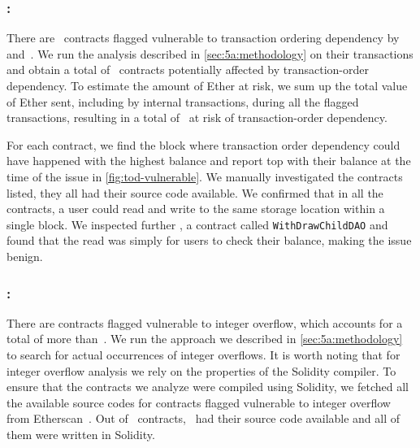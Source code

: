 



\subsubsection{\vto: \transactionorder}
There are~ contracts flagged vulnerable to transaction ordering dependency by~\cite{luu2016a} and~\cite{DBLP:conf/ndss/KalraGDS18}. We run the analysis described in \autoref{sec:5a:methodology} on their  transactions and obtain a total of~ contracts potentially affected by transaction-order dependency. To estimate the amount of Ether at risk, we sum up the total value of Ether sent, including by internal transactions, during all the flagged transactions, resulting in a total of~ at risk of transaction-order dependency.

For each contract, we find the block where transaction order dependency could have happened with the highest balance and report top with their balance at the time of the issue in \autoref{fig:tod-vulnerable}. We manually investigated the contracts listed, they all had their source code available. We confirmed that in all the contracts, a user could read and write to the same storage location within a single block. We inspected further , a contract called \lstinline{WithDrawChildDAO} and found that the read was simply for users to check their balance, making the issue benign.

% 



\subsubsection{\vio: \integeroverflow}
\label{ssec:analysis-io}
There are  contracts flagged vulnerable to integer overflow, which accounts for a total of more than~. We run the approach we described in \autoref{sec:5a:methodology} to search for actual occurrences of integer overflows.
It is worth noting that for integer overflow analysis we rely on the properties of the Solidity compiler. To ensure that the contracts we analyze were compiled using Solidity, we fetched all the available source codes for contracts flagged vulnerable to integer overflow from Etherscan~\cite{etherscan}. Out of~ contracts,~ had their source code available and all of them were written in Solidity.


